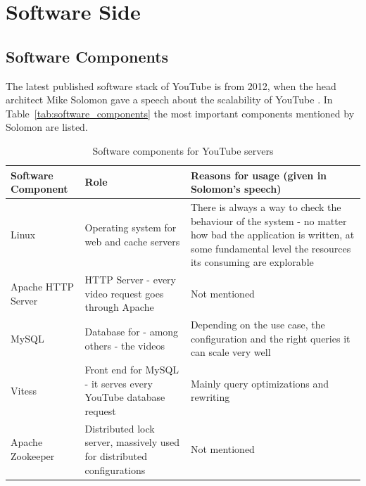 \section{Software Side}
\label{sec:software_side}
\subsection{Software Components}

The latest published software stack of YouTube is from 2012, when the head architect Mike Solomon gave a speech about the scalability of YouTube \cite{misc:scalibility_at_youtube, misc:hihgscalibility}. In Table~\vref{tab:software_components} the most important components mentioned by Solomon are listed.\\

\begin{table}[htbp]
  \begin{center}
    \begin{tabularx}{\textwidth}{|p{}|p{}|X|}
      \hline
      \textbf{Software \newline Component} & \textbf{Role} & \textbf{Reasons for usage} \newline (given in Solomon's speech) \\
      \hline
      \hline
      Linux & Operating system for web and cache servers & There is always a way to check the behaviour of the system - no matter how bad the application is written, at some fundamental level the resources its consuming are explorable \\
      \hline
      Apache \newline HTTP Server & HTTP Server - every video request goes through Apache & Not mentioned \\
      \hline
      MySQL & Database for - among others - the videos & Depending on the use case, the configuration and the right queries it can scale very well \\
      \hline
      Vitess & Front end for MySQL - it serves every YouTube database request & Mainly query optimizations and rewriting \\
      \hline
      Apache Zookeeper & Distributed lock server, massively used for distributed configurations & Not mentioned \\
      \hline
    \end{tabularx}
    \caption{Software components for YouTube servers}
    \label{tab:software_components}
  \end{center}
\end{table}

